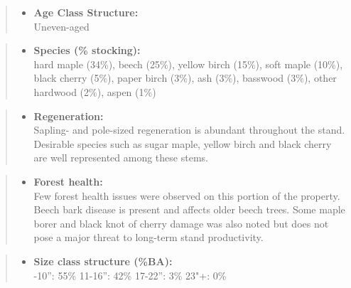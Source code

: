\documentclass[]{tufte-handout}
\providecommand{\tightlist}{%
  \setlength{\itemsep}{0pt}\setlength{\parskip}{0pt}}
\begin{document}
\begin{quote}
\begin{itemize}
\tightlist
\item
  \textbf{Age Class Structure:}\\
  \vspace{2pt} Uneven-aged
\end{itemize}
\end{quote}

\begin{quote}
\begin{itemize}
\tightlist
\item
  \textbf{Species (\% stocking):}\\
  \vspace{2pt} hard maple (34\%), beech (25\%), yellow birch (15\%),
  soft maple (10\%), black cherry (5\%), paper birch (3\%), ash (3\%),
  basswood (3\%), other hardwood (2\%), aspen (1\%)
\end{itemize}
\end{quote}

\begin{quote}
\begin{itemize}
\tightlist
\item
  \textbf{Regeneration:}\\
  \vspace{2pt} Sapling- and pole-sized regeneration is abundant
  throughout the stand. Desirable species such as sugar maple, yellow
  birch and black cherry are well represented among these stems.
\end{itemize}
\end{quote}

\begin{quote}
\begin{itemize}
\tightlist
\item
  \textbf{Forest health:}\\
  \vspace{2pt} Few forest health issues were observed on this portion of
  the property. Beech bark disease is present and affects older beech
  trees. Some maple borer and black knot of cherry damage was also noted
  but does not pose a major threat to long-term stand productivity.
\end{itemize}
\end{quote}

\begin{quote}
\begin{itemize}
\tightlist
\item
  \textbf{Size class structure (\%BA):}\\
  \vspace{2pt} -10'': 55\% \textbar{} 11-16'': 42\% \textbar{}
  17-22'': 3\% \textbar{} 23"+: 0\%
\end{itemize}
\end{quote}
\end{document}
